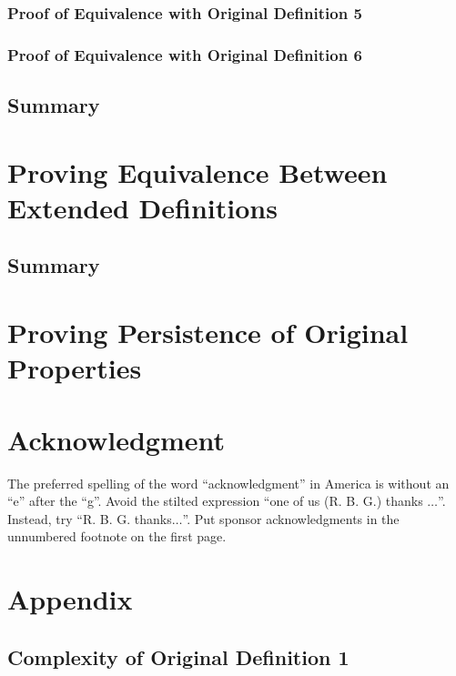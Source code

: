 \documentclass[conference]{IEEEtran}
\begin{document}

\subsubsection{Proof of Equivalence with Original Definition 5}


\subsubsection{Proof of Equivalence with Original Definition 6}

\subsection{Summary}

\section{Proving Equivalence Between Extended Definitions}

\subsection{Summary}

\section{Proving Persistence of Original Properties}

\section{Acknowledgment}

The preferred spelling of the word ``acknowledgment'' in America is without 
an ``e'' after the ``g''. Avoid the stilted expression ``one of us (R. B. 
G.) thanks $\ldots$''. Instead, try ``R. B. G. thanks$\ldots$''. Put sponsor 
acknowledgments in the unnumbered footnote on the first page.

\section{Appendix}

\subsection{Complexity of Original Definition 1}
\end{document}
